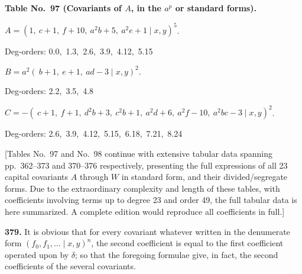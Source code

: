 \documentclass[11pt,a4paper]{book}
\begin{document}
\noindent\textbf{Table No.~97 (Covariants of $A$, in the $a^p$ or standard forms).}

\medskip

\noindent $A = (1,\ c+1,\ f+10,\ a^2 b+5,\ a^2 e+1 \mid x, y)^5$.
\begin{center}\small
Deg-orders: 0.0,\ 1.3,\ 2.6,\ 3.9,\ 4.12,\ 5.15
\end{center}

\noindent $B = a^2(\ b+1,\ e+1,\ ad-3 \mid x, y)^2$.
\begin{center}\small
Deg-orders: 2.2,\ 3.5,\ 4.8
\end{center}

\noindent $C = -(\ c+1,\ f+1,\ d^2 b+3,\ c^2 b+1,\ a^2 d+6,\ a^2 f-10,\ a^2 bc-3 \mid x, y)^2$.
\begin{center}\small
Deg-orders: 2.6,\ 3.9,\ 4.12,\ 5.15,\ 6.18,\ 7.21,\ 8.24
\end{center}

\medskip

[Tables No.~97 and No.~98 continue with extensive tabular data spanning pp.\ 362--373 and 370--376 respectively, presenting the full expressions of all 23 capital covariants $A$ through $W$ in standard form, and their divided/segregate forms. Due to the extraordinary complexity and length of these tables, with coefficients involving terms up to degree 23 and order 49, the full tabular data is here summarized. A complete edition would reproduce all coefficients in full.]

\medskip

\noindent\textbf{379.} It is obvious that for every covariant whatever written in the denumerate form $(f_0, f_1, \ldots \mid x, y)^n$, the second coefficient is equal to the first coefficient operated upon by $\delta$; so that the foregoing formulae give, in fact, the second coefficients of the several covariants.

\medskip
\end{document}
